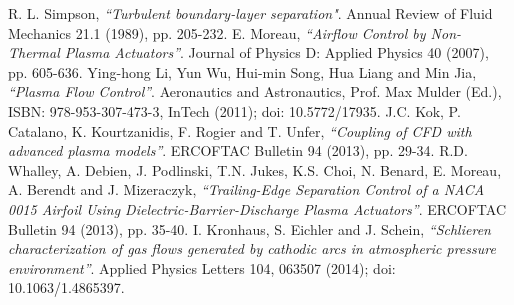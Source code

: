\documentclass[10pt,a4paper]{article}
\begin{document}
\begin{thebibliography}{99}

	R. L. Simpson, \emph{``Turbulent boundary-layer separation"}. Annual Review of Fluid Mechanics 21.1 (1989), pp. 205-232.‏
	E. Moreau, \emph{ ``Airflow Control by Non-Thermal Plasma Actuators''}. Journal of Physics D: Applied Physics 40 (2007), pp. 605-636.
	Ying-hong Li, Yun Wu, Hui-min Song, Hua Liang and Min Jia, \emph{``Plasma Flow Control''}. Aeronautics and Astronautics, Prof. Max Mulder (Ed.), ISBN: 978-953-307-473-3, InTech (2011); doi: 10.5772/17935. 
	J.C. Kok, P. Catalano, K. Kourtzanidis, F. Rogier and T. Unfer, \emph{``Coupling of CFD with advanced plasma models''}. ERCOFTAC Bulletin 94 (2013), pp. 29-34.
	R.D. Whalley, A. Debien, J. Podlinski, T.N. Jukes, K.S. Choi, N. Benard, E. Moreau, A. Berendt and J. Mizeraczyk, \emph{``Trailing-Edge Separation Control of a NACA 0015 Airfoil Using Dielectric-Barrier-Discharge Plasma Actuators''}. ERCOFTAC Bulletin 94 (2013), pp. 35-40.
	I. Kronhaus, S. Eichler and J. Schein,
	\emph{``Schlieren characterization of gas flows generated by cathodic arcs in atmospheric pressure environment”}. Applied Physics Letters 104, 063507 (2014); doi: 10.1063/1.4865397.
  

\end{thebibliography}
\end{document}
